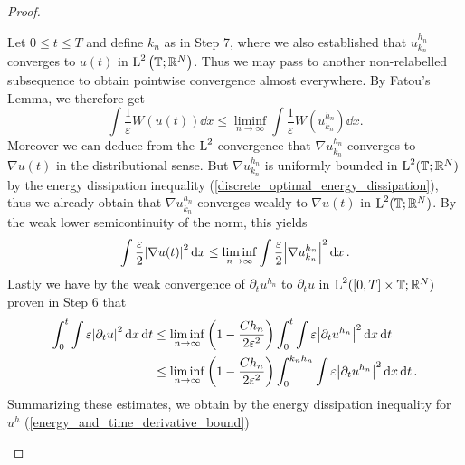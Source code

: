 \begin{proof}
\begin{description}[wide=0pt]
		Let $ 0 \leq t \leq T $ and define $ k_{ n } $ as in Step 7, where we 
		also established that $ u_{ k_{ n } }^{ h_{ n } } $ converges to $ u ( 
		t ) $ in $ \operatorname{L}^{ 2 } \left( \operatorname{\mathbb{T}} ; \mathbb{ R }^{ N } \right) $.
		Thus we may pass to another non-relabelled subsequence to obtain 
		pointwise convergence almost everywhere. By Fatou's Lemma, we therefore 
		get
		\begin{equation*}
			\int
			\frac{ 1 }{ \varepsilon }
			W ( u ( t ) ) 
			\dd{ x }
			\leq
			\liminf_{ n \to \infty }
			\int
			\frac{ 1 }{ \varepsilon }
			W ( u_{ k_{ n } }^{ h_{ n } } )
			\dd{ x }.
		\end{equation*}
		Moreover we can deduce from the $ \operatorname{L}^{ 2 } $-convergence that $ \nabla 
		u_{ k_{ n } }^{ h_{ n } } $ converges to $ \nabla u( t ) $ in the 
		distributional sense. But $ \nabla u_{ k_{ n } }^{ h_{ n } } $ is 
		uniformly bounded in $ \operatorname{L}^{ 2 } ( \operatorname{\mathbb{T}} ; \mathbb{ R }^{ N } ) $ 
		by the energy dissipation inequality 
		(\ref{discrete_optimal_energy_dissipation}), thus we already obtain 
		that $ \nabla u_{ k_{ n } }^{ h_{ n } } $ converges weakly to $ \nabla 
		u ( t ) $ in $ \operatorname{L}^{ 2 } ( \operatorname{\mathbb{T}}; \mathbb{ R }^{ N } ) $. 
		By the weak lower semicontinuity of the norm, this yields
		\begin{equation*}
			\int 
			\frac{ \varepsilon }{ 2 }
			\abs{ \nabla u ( t ) }^{ 2 }
			\dd{ x }
			\leq
			\liminf_{ n \to \infty }
			\int
			\frac{ \varepsilon }{ 2 }
			\abs{ \nabla u_{ k_{ n } }^{ h_{ n } } }^{ 2 }
			\dd{ x }.
		\end{equation*}
		Lastly we have by the weak convergence of $ \partial_{ t } u^{ h_{n } } 
		$ to $ \partial_{ t} u $ in $\operatorname{L}^{ 2 } ( [ 0, T ] \times  \operatorname{\mathbb{T}} ; 
		\mathbb{ R }^{ N } ) $ proven in Step 6 that
		\begin{align*}
			\int_{ 0 }^{ t }
			\int
			\varepsilon
			\abs{ \partial_{ t } u }^{ 2 }
			\dd{ x }
			\dd{ t }
			& \leq
			\liminf_{ n \to \infty }
			\left( 1 - \frac{ C h_{ n } }{ 2 \varepsilon^{ 2 } } \right)
			\int_{ 0 }^{ t }
			\int
			\varepsilon
			\abs{ \partial_{ t } u^{ h_{ n } } }^{ 2 }
			\dd{ x }
			\dd{ t }
			\\
			& \leq
			\liminf_{ n \to \infty }
			\left( 1 - \frac{ C h_{ n } }{ 2 \varepsilon^{ 2 } } \right)
			\int_{ 0 }^{ k_{ n } h_{ n } }
			\int
			\varepsilon
			\abs{ \partial_{ t } u^{ h_{ n } } }^{ 2 }
			\dd{ x }
			\dd{ t }.		
		\end{align*}
		Summarizing these estimates, we obtain by the energy dissipation 
		inequality for $ u^{ h } $ (\ref{energy_and_time_derivative_bound}) 

\end{description}
\end{proof}
